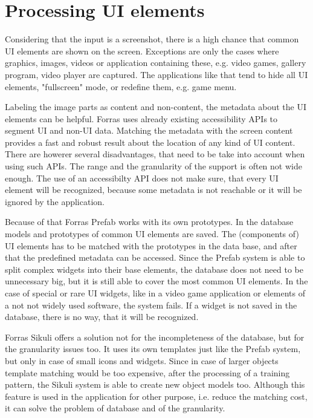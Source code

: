 \documentclass[draft,final]{vutinfth} %
\begin{document}
\section{Processing UI elements}
Considering that the input is a screenshot, there is a high chance that common UI elements are shown on the screen.
Exceptions are only the cases where graphics, images, videos or application containing these, e.g. video games, gallery program, video player are captured.
The applications like that tend to hide all UI elements, "fullscreen" mode, or redefine them, e.g. game menu.\par
Labeling the image parts as content and non-content, the metadata about the UI elements can be helpful.
Forras uses already existing accessibility APIs to segment UI and non-UI data. 
Matching the metadata with the screen content provides a fast and robust result about the location of any kind of UI content.
There are howerer several disadvantages, that need to be take into account when using such APIs.
The range and the granularity of the support is often not wide enough.
The use of an accessibilty API does not make sure, that every UI element will be recognized, because some metadata is not reachable or it will be ignored by the application.\par
Because of that Forras Prefab works with its own prototypes. 
In the database models and  prototypes of common UI elements are saved.
The (components of) UI elements has to be matched with the prototypes in the data base, and after that the predefined metadata can be accessed.
Since the Prefab system is able to split complex widgets into their base elements, the database does not need to be unnecessary big, but it is still able to cover the most common UI elements.
In the case of special or rare UI widgets, like in a video game application or elements of a not not widely used software, the system fails.
If a widget is not saved in the database, there is no way, that it will be recognized.\par
Forras Sikuli offers a solution not for the incompleteness of the database, but for the granularity issues too.
It uses its own templates just like the Prefab system, but only in case of small icons and widgets.
Since in case of larger objects template matching would be too expensive, after the processing of a training pattern, the Sikuli system is able to create new object models too.
Although this feature is used in the application for other purpose, i.e. reduce the matching cost, it can solve the problem of database and of the granularity.
\end{document}
